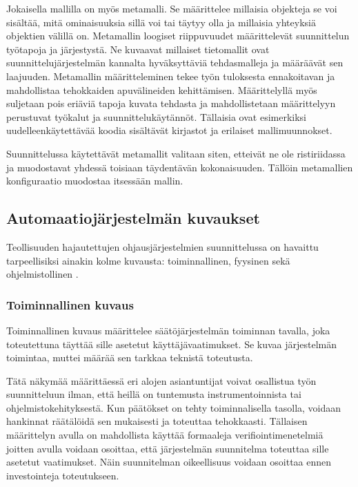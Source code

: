 \documentclass[finnish,12pt]{article}
\begin{document}
Jokaisella mallilla on myös metamalli. Se määrittelee millaisia objekteja se voi sisältää, mitä ominaisuuksia sillä voi tai täytyy olla ja millaisia yhteyksiä objektien välillä on.
Metamallin loogiset riippuvuudet määrittelevät suunnittelun työtapoja ja järjestystä.
Ne kuvaavat millaiset tietomallit ovat suunnittelujärjestelmän kannalta hyväksyttäviä tehdasmalleja ja
määräävät sen laajuuden. Metamallin määritteleminen tekee työn tuloksesta ennakoitavan ja mahdollistaa tehokkaiden apuvälineiden kehittämisen.
Määrittelyllä myös suljetaan pois eriäviä tapoja kuvata tehdasta ja mahdollistetaan määrittelyyn perustuvat työkalut ja suunnittelukäytännöt.
Tällaisia ovat esimerkiksi uudelleenkäytettävää koodia sisältävät kirjastot ja erilaiset mallimuunnokset.

Suunnittelussa käytettävät metamallit valitaan siten, etteivät ne ole ristiriidassa ja muodostavat yhdessä toisiaan täydentävän kokonaisuuden.
Tällöin metamallien konfiguraatio muodostaa itsessään mallin.


	\subsection{Automaatiojärjestelmän kuvaukset}

Teollisuuden hajautettujen ohjausjärjestelmien suunnittelussa on havaittu
tarpeellisiksi ainakin kolme kuvausta: toiminnallinen, fyysinen sekä ohjelmistollinen \cite{RefWorks:38}.

		\subsubsection{Toiminnallinen kuvaus}

Toiminnallinen kuvaus määrittelee säätöjärjestelmän toiminnan tavalla, joka toteutettuna täyttää sille asetetut käyttäjävaatimukset.
Se kuvaa järjestelmän toimintaa, muttei määrää sen tarkkaa teknistä toteutusta. \cite{RefWorks:60}

Tätä näkymää määrittäessä eri alojen asiantuntijat voivat osallistua työn suunnitteluun ilman, että heillä on tuntemusta instrumentoinnista tai ohjelmistokehityksestä.
Kun päätökset on tehty toiminnalisella tasolla, voidaan hankinnat räätälöidä sen mukaisesti ja toteuttaa tehokkaasti.
Tällaisen määrittelyn avulla on mahdollista käyttää formaaleja verifiointimenetelmiä joitten avulla
voidaan osoittaa, että järjestelmän suunnitelma toteuttaa sille asetetut vaatimukset.
Näin suunnitelman oikeellisuus voidaan osoittaa ennen investointeja toteutukseen. \cite{RefWorks:41}
\end{document}
